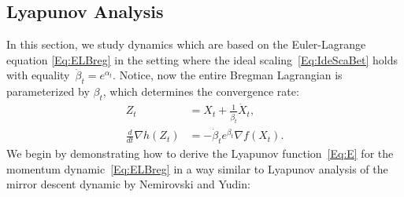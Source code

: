 \documentclass[11pt]{article}
\theoremstyle{plain}
\begin{document}
 \subsection{Lyapunov Analysis}
In this section, we study dynamics which are based on the Euler-Lagrange equation \eqref{Eq:ELBreg} in the setting where the ideal scaling~\eqref{Eq:IdeScaBet} holds with equality~$\dot \beta_t = e^{\alpha_t}$. Notice, now the entire Bregman Lagrangian is parameterized by $\beta_t$, which determines the convergence rate:
 \begin{subequations}\label{Eq:EL}
 \begin{align}
 Z_t &= X_t + \frac{1}{\dot \beta_t} \dot X_t \label{Eq:ELZ},\\
 \frac{d}{dt}\nabla h(Z_t) &= -\dot \beta_t e^{\beta_t} \nabla f(X_t)\label{Eq:ELH}.
 \end{align}
 \end{subequations}
  We begin by demonstrating how to derive the Lyapunov function~\eqref{Eq:E} for the momentum dynamic~\eqref{Eq:ELBreg} in a way similar to Lyapunov analysis of the mirror descent dynamic by Nemirovski and Yudin:

  
  
\end{document}
